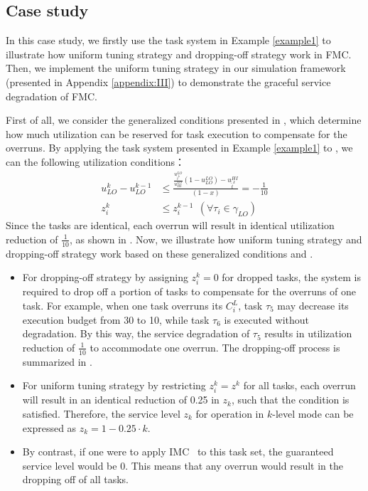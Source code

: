 \documentclass[10pt,journal,compsoc]{IEEEtran}
\begin{document}
\subsection{Case study}
\label{sec:cs}
{
In this case study, we firstly use the task system in Example \ref{example1} to illustrate how uniform tuning strategy and dropping-off strategy work in FMC. Then, we implement the uniform tuning strategy in our simulation framework (presented in Appendix \ref{appendix:III}) to demonstrate the graceful \lo service degradation of FMC.
  
First of all, we consider the generalized conditions presented in , which determine how much utilization can be reserved for \lo task execution to compensate for the overruns. By applying the task system presented in Example \ref{example1} to , we can the following utilization conditions：
\begin{align}
\label{example:gen:1}
u_{LO}^{k}-u_{LO}^{k-1}&\le{\frac{\frac{u_{\hat{t}^k}^{LO}}{u_{HI}^{LO}}(1-u_{LO}^{LO})-u_{\hat{t}^k}^{HI}}{(1-x)}}=-\frac{1}{10} \\
\label{example:gen:2}
z_i^k&\le{}z_i^{k-1}\ \ (\forall \tau_i \in \gamma_{LO})
\end{align}
Since the \hi tasks are identical, each overrun will result in identical utilization reduction of $\frac{1}{10}$, as shown in . Now, we illustrate how uniform tuning strategy and dropping-off strategy work based on these generalized conditions  and . 
\begin{itemize}
\item For dropping-off strategy by assigning $z_i^k=0$ for dropped tasks, the system is required to drop off a portion of \lo tasks to compensate for the overruns of one \hi task. For example, when one \hi task overruns its $C_i^L$, \lo task $\tau_5$ may decrease its execution budget from 30 to 10, while \lo task $\tau_6$ is executed without degradation. By this way, the service degradation of $\tau_5$ results in utilization reduction of $\frac{1}{10}$ to accommodate one \hi overrun. The dropping-off process is summarized in .       
%
\item For uniform tuning strategy by restricting $z_i^k=z^k$ for all \lo tasks, each overrun will result in an identical reduction of 0.25 in $z_k$, such that the condition  is satisfied. Therefore, the service level $z_k$ for operation in $k$-level \hi mode can be expressed as $z_k=1-0.25\cdot{}k$.  
\item By contrast, if one were to apply IMC~\cite{DiLiu} to this task set, the guaranteed service level would be 0. This means that any overrun would result in the dropping off of all \lo tasks.   
\end{itemize}

}
\end{document}
